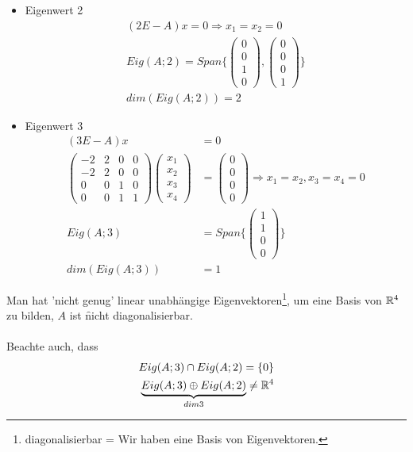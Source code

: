 \begin{itemize}
 \item Eigenwert 2
\begin{align}
(2E - A)x = 0 \Rightarrow x_1 = x_2 = 0 \\
Eig(A; 2) = Span\{\begin{pmatrix} 0 \\ 0 \\ 1 \\ 0 \end{pmatrix}, \begin{pmatrix} 0 \\ 0 \\ 0 \\ 1\end{pmatrix}\} \\
dim(Eig(A;2)) = 2
\end{align}
\item Eigenwert 3
\begin{align}
(3E- A)x &= 0 \\
\begin{pmatrix} -2 & 2 & 0 & 0 \\ -2 & 2 & 0 & 0 \\ 0 & 0 & 1 & 0 \\ 0 & 0 & 1 & 1 \end{pmatrix} \begin{pmatrix} x_1 \\ x_2 \\ x_3 \\ x_4 \end{pmatrix} &= \begin{pmatrix} 0 \\ 0 \\ 0 \\ 0 \end{pmatrix} \Rightarrow x_1 = x_2, x_3 = x_4 = 0 \\
Eig(A; 3) &= Span\{\begin{pmatrix} 1 \\ 1 \\ 0 \\ 0 \end{pmatrix}\} \\
dim(Eig(A; 3)) &= 1 
\end{align}
\end{itemize}
Man hat 'nicht genug' linear unabhängige Eigenvektoren\footnote{diagonalisierbar = Wir haben eine Basis von Eigenvektoren.}, um eine Basis von $\mathbb{R}^4$ zu bilden, $A$ ist \f{nicht} diagonalisierbar.\\\\
Beachte auch, dass
\begin{align}
Eig(A; 3) \cap Eig(A; 2) = \{0\} \\
\underbrace{Eig(A; 3) \oplus Eig(A;2)}_{dim 3} \neq \mathbb{R}^4
\end{align}

